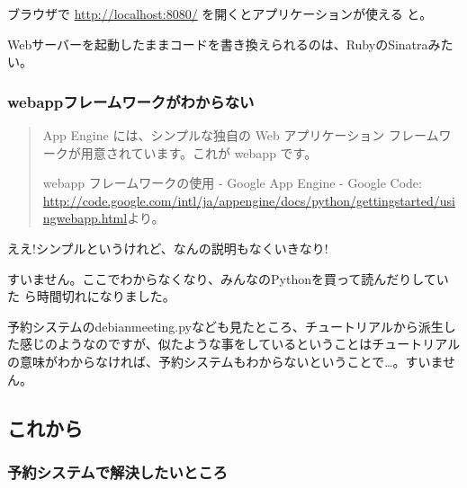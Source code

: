 \documentclass[mingoth,a4paper]{jsarticle}
\begin{document}
ブラウザで \url{http://localhost:8080/} を開くとアプリケーションが使える
と。

Webサーバーを起動したままコードを書き換えられるのは、RubyのSinatraみたい。

\subsubsection{webappフレームワークがわからない}

\begin{quote}
App Engine には、シンプルな独自の Web アプリケーション フレームワークが用意されています。これが webapp です。

webapp フレームワークの使用 - Google App Engine - Google Code:
 \url{http://code.google.com/intl/ja/appengine/docs/python/gettingstarted/usingwebapp.html}より。

\end{quote}
 

ええ!シンプルというけれど、なんの説明もなくいきなり!

すいません。ここでわからなくなり、みんなのPythonを買って読んだりしていた
ら時間切れになりました。

予約システムのdebianmeeting.pyなども見たところ、チュートリアルから派生し
た感じのようなのですが、似たような事をしているということはチュートリアル
の意味がわからなければ、予約システムもわからないということで…。すいませ
ん。


\subsection{これから}


\subsubsection{予約システムで解決したいところ}
\end{document}
